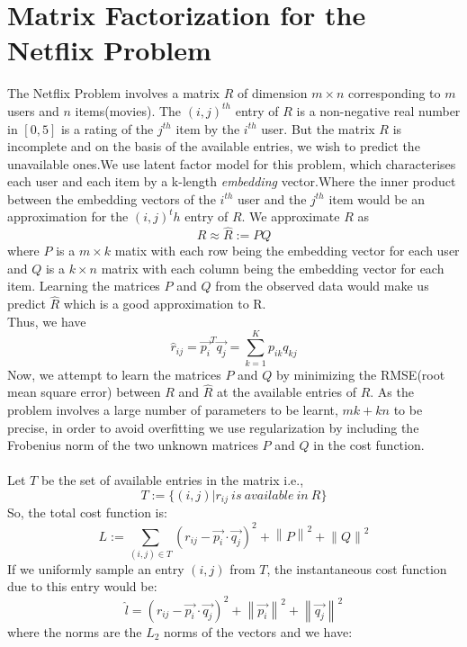 \documentclass[11pt, english]{article}
\newcommand\norm[1]{\left\lVert#1\right\rVert}
\begin{document}
\section{Matrix Factorization for the Netflix Problem}
The Netflix Problem involves a matrix $R$ of dimension $m \times n$ corresponding to $m$ users and $n$ items(movies). The $(i,j)^{th}$ entry of $R$ is a non-negative real number in $[0,5]$ is a rating of the $j^{th}$ item by the $i^{th}$ user. But the matrix $R$ is incomplete and on the basis of the available entries, we wish to predict the unavailable ones.We use latent factor model for this problem, which characterises each user and each item by a k-length \textit{embedding} vector.Where the inner product between the embedding vectors of the $i^{th}$ user and the $j^{th}$ item would be an approximation for the $(i,j)^th$ entry of $R$. We approximate $R$ as
\begin{equation}
    R\approx \hat{R}:=PQ 
\end{equation}
where $P$ is a $m \times k$ matix with each row being the embedding vector for each user and $Q$ is a $k \times n$ matrix with each column being the embedding vector for each item.
Learning the matrices $P$ and $Q$ from the observed data would make us predict $\hat{R}$ which is a good approximation to R.\\
Thus, we have
\begin{equation}
    \hat{r}_{ij}=\vec{p_{i}}^{T}\vec{q_{j}}=\sum\limits_{k=1}^{K}p_{ik}q_{kj}
\end{equation} 
Now, we attempt to learn the matrices $P$ and $Q$ by minimizing the RMSE(root mean square error) between $R$ and $\hat{R}$ at the available entries of $R$. As the problem involves a large number of parameters to be learnt, $mk+kn$ to be precise, in order to avoid overfitting we use regularization by including the Frobenius norm of the two unknown matrices $P$ and $Q$ in the cost function.\\\\
Let $T$ be the set of available entries in the matrix i.e.,
\begin{equation}
    T:=\{(i,j)|r_{ij}~is~available~in~R\}
\end{equation}
 So, the total cost function is:
 \begin{equation}
     L:=\sum\limits_{(i,j)\in T} (r_{ij}-\vec{p_{i}}\cdot \vec{q_{j}})^{2} +\norm{P}^2+\norm{Q}^2
 \end{equation}
 If we uniformly sample an entry $(i,j)$ from $T$, the instantaneous cost function due to this entry would be:
 \begin{equation}
     \hat{l}=(r_{ij}-\vec{p_{i}}\cdot\vec{q_{j}})^2 + \norm{\vec{p_{i}}}^2+\norm{\vec{q_{j}}}^2
 \end{equation}
 where the norms are the $L_2$ norms of the vectors and we have:
 
\end{document}
